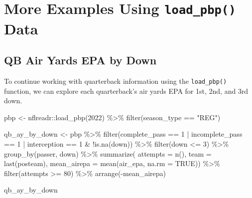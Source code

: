 \documentclass[
  letterpaper,
]{krantz}
\newenvironment{Shaded}{\begin{snugshade}}{\end{snugshade}}
\newcommand{\AttributeTok}[1]{\textcolor[rgb]{0.40,0.45,0.13}{#1}}
\newcommand{\ConstantTok}[1]{\textcolor[rgb]{0.56,0.35,0.01}{#1}}
\newcommand{\DecValTok}[1]{\textcolor[rgb]{0.68,0.00,0.00}{#1}}
\newcommand{\FunctionTok}[1]{\textcolor[rgb]{0.28,0.35,0.67}{#1}}
\newcommand{\NormalTok}[1]{\textcolor[rgb]{0.00,0.23,0.31}{#1}}
\newcommand{\OtherTok}[1]{\textcolor[rgb]{0.00,0.23,0.31}{#1}}
\newcommand{\SpecialCharTok}[1]{\textcolor[rgb]{0.37,0.37,0.37}{#1}}
\newcommand{\StringTok}[1]{\textcolor[rgb]{0.13,0.47,0.30}{#1}}
\begin{document}
\hypertarget{more-examples-using-load_pbp-data}{%
\section{\texorpdfstring{More Examples Using \texttt{load\_pbp()}
Data}{More Examples Using load\_pbp() Data}}\label{more-examples-using-load_pbp-data}}

\hypertarget{qb-air-yards-epa-by-down}{%
\subsection{QB Air Yards EPA by Down}\label{qb-air-yards-epa-by-down}}

To continue working with quarterback information using the
\texttt{load\_pbp()} function, we can explore each quarterback's air
yards EPA for 1st, 2nd, and 3rd down.

\begin{Shaded}
\begin{Highlighting}[]
\NormalTok{pbp }\OtherTok{\textless{}{-}}\NormalTok{ nflreadr}\SpecialCharTok{::}\FunctionTok{load\_pbp}\NormalTok{(}\DecValTok{2022}\NormalTok{) }\SpecialCharTok{\%\textgreater{}\%}
  \FunctionTok{filter}\NormalTok{(season\_type }\SpecialCharTok{==} \StringTok{"REG"}\NormalTok{)}

\NormalTok{qb\_ay\_by\_down }\OtherTok{\textless{}{-}}\NormalTok{ pbp }\SpecialCharTok{\%\textgreater{}\%}
  \FunctionTok{filter}\NormalTok{(complete\_pass }\SpecialCharTok{==} \DecValTok{1} \SpecialCharTok{|}
\NormalTok{           incomplete\_pass }\SpecialCharTok{==} \DecValTok{1} \SpecialCharTok{|}
\NormalTok{           interception }\SpecialCharTok{==} \DecValTok{1} \SpecialCharTok{\&}
           \SpecialCharTok{!}\FunctionTok{is.na}\NormalTok{(down)) }\SpecialCharTok{\%\textgreater{}\%}
  \FunctionTok{filter}\NormalTok{(down }\SpecialCharTok{\textless{}=} \DecValTok{3}\NormalTok{) }\SpecialCharTok{\%\textgreater{}\%}
  \FunctionTok{group\_by}\NormalTok{(passer, down) }\SpecialCharTok{\%\textgreater{}\%}
  \FunctionTok{summarize}\NormalTok{(}
    \AttributeTok{attempts =} \FunctionTok{n}\NormalTok{(),}
    \AttributeTok{team =} \FunctionTok{last}\NormalTok{(posteam),}
    \AttributeTok{mean\_airepa =} \FunctionTok{mean}\NormalTok{(air\_epa, }\AttributeTok{na.rm =} \ConstantTok{TRUE}\NormalTok{)) }\SpecialCharTok{\%\textgreater{}\%}
  \FunctionTok{filter}\NormalTok{(attempts }\SpecialCharTok{\textgreater{}=} \DecValTok{80}\NormalTok{) }\SpecialCharTok{\%\textgreater{}\%}
  \FunctionTok{arrange}\NormalTok{(}\SpecialCharTok{{-}}\NormalTok{mean\_airepa)}

\NormalTok{qb\_ay\_by\_down}
\end{Highlighting}
\end{Shaded}
\end{document}
